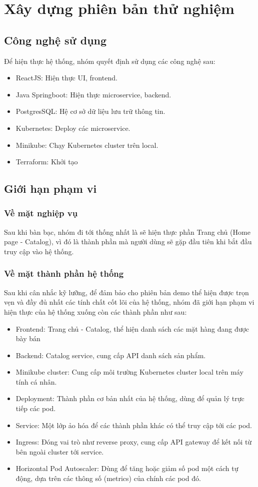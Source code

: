 \chapter{Xây dựng phiên bản thử nghiệm}
\section{Công nghệ sử dụng}
Để hiện thực hệ thống, nhóm quyết định sử dụng các công nghệ sau:
\begin{itemize}
    \item ReactJS: Hiện thực UI, frontend.
    \item Java Springboot: Hiện thực microservice, backend.
    \item PostgresSQL: Hệ cơ sở dữ liệu lưu trữ thông tin.
    \item Kubernetes: Deploy các microservice.
    \item Minikube: Chạy Kubernetes cluster trên local.
    \item Terraform: Khởi tạo 
\end{itemize}

\section{Giới hạn phạm vi}
\subsection{Về mặt nghiệp vụ}
\noindent Sau khi bàn bạc, nhóm đi tới thống nhất là sẽ hiện thực phần Trang chủ (Home page - Catalog), vì đó là thành phần mà người dùng sẽ gặp đầu tiên khi bắt đầu truy cập vào hệ thống.
\subsection{Về mặt thành phần hệ thống}
\noindent Sau khi cân nhắc kỹ lưỡng, để đảm bảo cho phiên bản demo thể hiện được trọn vẹn và đầy đủ nhất các tính chất cốt lõi của hệ thống, nhóm đã giới hạn phạm vi hiện thực của hệ thống xuống còn các thành phần như sau:
\begin{itemize}
    \item Frontend: Trang chủ - Catalog, thể hiện danh sách các mặt hàng đang được bày bán 
    \item Backend: Catalog service, cung cấp API danh sách sản phẩm.
    \item Minikube cluster: Cung cấp môi trường Kubernetes cluster local trên máy tính cá nhân.
    \item Deployment: Thành phần cơ bản nhất của hệ thống, dùng để quản lý trực tiếp các pod.
    \item Service: Một lớp ảo hóa để các thành phần khác có thể truy cập tới các pod.
    \item Ingress: Đóng vai trò như reverse proxy, cung cấp API gateway để kết nối từ bên ngoài cluster tới service.
    \item Horizontal Pod Autoscaler: Dùng để tăng hoặc giảm số pod một cách tự động, dựa trên các thông số (metrics) của chính các pod đó.
\end{itemize}
